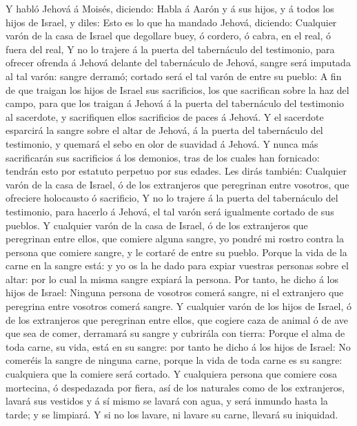  Y habló Jehová á Moisés, diciendo:  Habla á
Aarón y á sus hijos, y á todos los hijos de Israel, y diles: Esto es lo
que ha mandado Jehová, diciendo:  Cualquier varón de la casa
de Israel que degollare buey, ó cordero, ó cabra, en el real, ó fuera
del real,  Y no lo trajere á la puerta del tabernáculo del
testimonio, para ofrecer ofrenda á Jehová delante del tabernáculo de
Jehová, sangre será imputada al tal varón: sangre derramó; cortado será
el tal varón de entre su pueblo:  A fin de que traigan los
hijos de Israel sus sacrificios, los que sacrifican sobre la haz del
campo, para que los traigan á Jehová á la puerta del tabernáculo del
testimonio al sacerdote, y sacrifiquen ellos sacrificios de paces á
Jehová.  Y el sacerdote esparcirá la sangre sobre el altar
de Jehová, á la puerta del tabernáculo del testimonio, y quemará el sebo
en olor de suavidad á Jehová.  Y nunca más sacrificarán sus
sacrificios á los demonios, tras de los cuales han fornicado: tendrán
esto por estatuto perpetuo por sus edades.  Les dirás
también: Cualquier varón de la casa de Israel, ó de los extranjeros que
peregrinan entre vosotros, que ofreciere holocausto ó sacrificio,
 Y no lo trajere á la puerta del tabernáculo del testimonio,
para hacerlo á Jehová, el tal varón será igualmente cortado de sus
pueblos.  Y cualquier varón de la casa de Israel, ó de los
extranjeros que peregrinan entre ellos, que comiere alguna sangre, yo
pondré mi rostro contra la persona que comiere sangre, y le cortaré de
entre su pueblo.  Porque la vida de la carne en la sangre
está: y yo os la he dado para expiar vuestras personas sobre el altar:
por lo cual la misma sangre expiará la persona.  Por tanto,
he dicho á los hijos de Israel: Ninguna persona de vosotros comerá
sangre, ni el extranjero que peregrina entre vosotros comerá sangre.
 Y cualquier varón de los hijos de Israel, ó de los
extranjeros que peregrinan entre ellos, que cogiere caza de animal ó de
ave que sea de comer, derramará su sangre y cubrirála con tierra:
 Porque el alma de toda carne, su vida, está en su sangre:
por tanto he dicho á los hijos de Israel: No comeréis la sangre de
ninguna carne, porque la vida de toda carne es su sangre: cualquiera que
la comiere será cortado.  Y cualquiera persona que comiere
cosa mortecina, ó despedazada por fiera, así de los naturales como de
los extranjeros, lavará sus vestidos y á sí mismo se lavará con agua, y
será inmundo hasta la tarde; y se limpiará.  Y si no los
lavare, ni lavare su carne, llevará su iniquidad.

